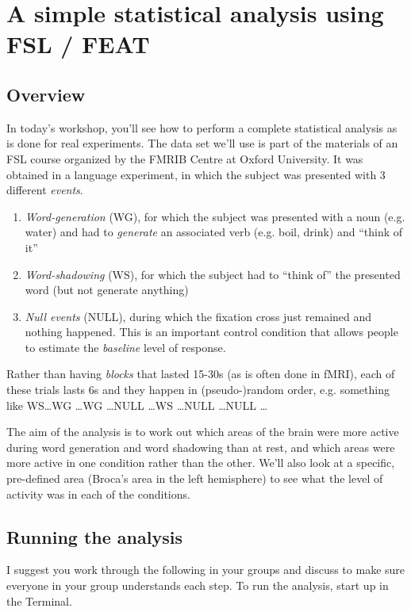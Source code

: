 \section{A simple statistical analysis using FSL / FEAT}

\subsection{Overview}
In today's workshop, you'll see how to perform a complete statistical analysis as is done for real experiments. The data set we'll use is part of the materials of an FSL course organized by the FMRIB Centre at Oxford University. It was obtained in a language experiment, in which the subject was presented with 3 different \emph{events}. 

\begin{enumerate}
\item \emph{Word-generation} (WG), for which the subject was presented with a noun (e.g. water) and had to \emph{generate} an associated verb (e.g. boil, drink) and ``think of it''
\item \emph{Word-shadowing} (WS), for which the subject had to ``think of'' the presented word (but not generate anything)
\item \emph{Null events} (NULL), during which the fixation cross just remained and nothing happened. This is an important control condition that allows people to estimate the \emph{baseline} level of response.
\end{enumerate}

Rather than having \emph{blocks} that lasted 15-30s (as is often done in fMRI), each of these trials lasts 6s and they happen in (pseudo-)random order, e.g. something like
WS\dots WG \dots WG \dots NULL \dots WS \dots NULL \dots NULL \dots

The aim of the analysis is to work out which areas of the brain were more active during word generation and word shadowing than at rest, and which areas were more active in one condition rather than the other. We'll also look at a specific, pre-defined area (Broca's area in the left hemisphere) to see what the level of activity was in each of the conditions.

\subsection{Running the analysis}

I suggest you work through the following in your groups and discuss to make sure everyone in your group understands each step. To run the analysis, start up  in the Terminal.

